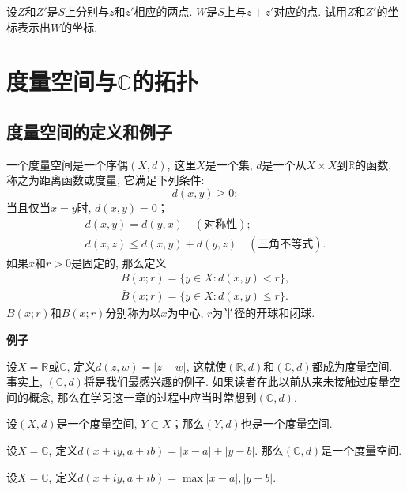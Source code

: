 \begin{exercise}
设$Z$和$Z'$是$S$上分别与$z$和$z'$相应的两点. $W$是$S$上与$z+z'$对应的点. 试用$Z$和$Z'$的坐标表示出$W$的坐标. 
\end{exercise}

\chapter{度量空间与$\mathbb{C}$的拓扑}\label{section00202}

\section{度量空间的定义和例子}\label{subsection0020201}
一个度量空间是一个序偶$(X, d)$, 这里$X$是一个集, $d$是一个从$X \times X$到$\mathbb{R}$的函数, 称之为距离函数或度量, 它满足下列条件: 
\[
d(x, y) \ge 0;
\]
当且仅当$x=y$时, $d(x, y)=0$；
\begin{gather*}
d(x, y) = d(y,x) \quad (\text{对称性});\\
d(x, z) \le d(x, y) + d(y, z)\quad (\text{三角不等式}).
\end{gather*}
如果$x$和$r > 0$是固定的, 那么定义
\begin{gather*}
B(x; r) = \{y \in X: d(x, y) < r\},\\
\bar{B}(x; r) = \{y \in X: d(x, y) \le r\}.
\end{gather*}
$B(x; r)$和$\bar{B}(x; r)$分别称为以$x$为中心, $r$为半径的开球和闭球. 

\textbf{例子}

\begin{example}\label{exam002020101}
设$X = \mathbb{R}$或$\mathbb{C}$, 定义$d(z, w)=|z-w|$, 这就使$(\mathbb{R}, d)$和$(\mathbb{C}, d)$都成为度量空间. 事实上, $(\mathbb{C}, d)$将是我们最感兴趣的例子. 如果读者在此以前从来未接触过度量空间的概念, 那么在学习这一章的过程中应当时常想到$(\mathbb{C}, d)$. 
\end{example}

\begin{example}\label{exam002020102}
设$(X, d)$是一个度量空间, $Y \subset X$；那么$(Y, d)$也是一个度量空间. 
\end{example}

\begin{example}\label{exam002020103}
设$X = \mathbb{C}$, 定义$d(x+iy, a+ib)=|x-a|+|y-b|$. 那么$(\mathbb{C}, d)$是一个度量空间. 
\end{example}

\begin{example}\label{exam002020104}
设$X = \mathbb{C}$, 定义$d(x+iy, a+ib)=\max{|x-a|, |y-b|}$. 
\end{example}

